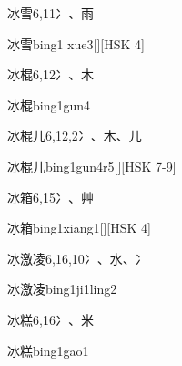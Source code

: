 \begin{Entry}{冰雪}{6,11}{⼎、⾬}
  \begin{Phonetics}{冰雪}{bing1 xue3}[][HSK 4]
  \end{Phonetics}
\end{Entry}

\begin{Entry}{冰棍}{6,12}{⼎、⽊}
  \begin{Phonetics}{冰棍}{bing1gun4}
  \end{Phonetics}
\end{Entry}

\begin{Entry}{冰棍儿}{6,12,2}{⼎、⽊、⼉}
  \begin{Phonetics}{冰棍儿}{bing1gun4r5}[][HSK 7-9]
  \end{Phonetics}
\end{Entry}

\begin{Entry}{冰箱}{6,15}{⼎、⾋}
  \begin{Phonetics}{冰箱}{bing1xiang1}[][HSK 4]
  \end{Phonetics}
\end{Entry}

\begin{Entry}{冰激凌}{6,16,10}{⼎、⽔、⼎}
  \begin{Phonetics}{冰激凌}{bing1ji1ling2}
  \end{Phonetics}
\end{Entry}

\begin{Entry}{冰糕}{6,16}{⼎、⽶}
  \begin{Phonetics}{冰糕}{bing1gao1}
  \end{Phonetics}
\end{Entry}

